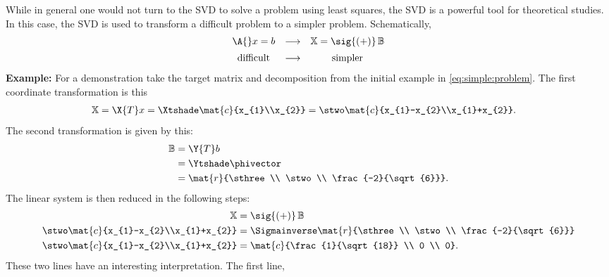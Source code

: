 While in general one would not turn to the SVD to solve a problem using least squares, the SVD is a powerful tool for theoretical studies. In this case, the SVD is used to transform a difficult problem to a simpler problem. Schematically,
$$
\begin{array}{ ccc }
  \A{} x = b  & \longrightarrow  &  \mathbb{X} = \sig{(+)}\, \mathbb{B} \\[5pt]
   \text{difficult}  & \longrightarrow  &  \text{simpler}  \\
\end{array}
$$
\textbf{Example:} 
For a demonstration take the target matrix and decomposition from the initial example in \eqref{eq:simple:problem}. The first coordinate transformation is this
\begin{equation}
  \begin{split}
    \mathbb{X} & = \X{T} x = \Xtshade \mat{c}{x_{1}\\x_{2}} = \stwo \mat{c}{x_{1}-x_{2}\\x_{1}+x_{2}}.
  \end{split}
\end{equation}
The second transformation is given by this:
\begin{equation}
  \begin{split}
    \mathbb{B} & = \Y{T} b \\
    &= \Ytshade \phivector \\
    &= \mat{r}{\sthree \\ \stwo \\ \frac{-2}{\sqrt{6}}}.
  \end{split}
\end{equation}
The linear system is then reduced in the following steps:
\begin{equation}
  \begin{split}
    \mathbb{X} &= 
    \sig{(+)}\,\mathbb{B} \\
    \stwo 
    \mat{c}{x_{1}-x_{2}\\x_{1}+x_{2}} & = 
    \Sigmainverse
    \mat{r}{\sthree \\ \stwo \\ \frac{-2}{\sqrt{6}}}\\
    \stwo 
    \mat{c}{x_{1}-x_{2}\\x_{1}+x_{2}} &= 
    \mat{c}{\frac{1}{\sqrt{18}} \\ 0 \\ 0}.
  \end{split}
\end{equation}
These two lines have an interesting interpretation. The first line,
